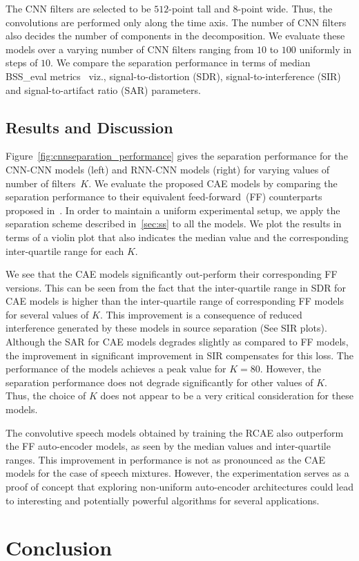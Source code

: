 \documentclass{article}
\begin{document}
The CNN filters are selected to be $512$-point tall and $8$-point wide. Thus, the convolutions are performed only along the time axis. The number of CNN filters also decides the number of components in the decomposition. We evaluate these models over a varying number of CNN filters ranging from $10$ to $100$ uniformly in steps of $10$. We compare the separation performance in terms of median BSS\_eval metrics~\cite{fevotte2005bss_eval} viz., signal-to-distortion (SDR), signal-to-interference (SIR) and signal-to-artifact ratio (SAR) parameters.

\subsection{Results and Discussion}
\label{subsec:results}
Figure~\ref{fig:cnnseparation_performance} gives the separation performance for the CNN-CNN models (left) and RNN-CNN models (right) for varying values of number of filters~$K$. We evaluate the proposed CAE models by comparing the separation performance to their equivalent feed-forward~(FF) counterparts proposed in~\cite{smaragdis2017aneural}. In order to maintain a uniform experimental setup, we apply the separation scheme described in~\ref{sec:ss} to all the models. We plot the results in terms of a violin plot that also indicates the median value and the corresponding inter-quartile range for each $K$.

We see that the CAE models significantly out-perform their corresponding FF versions. This can be seen from the fact that the inter-quartile range in SDR for CAE models is higher than the inter-quartile range of corresponding FF models for several values of $K$. This improvement is a consequence of reduced interference generated by these models in source separation (See SIR plots). Although the SAR for CAE models degrades slightly as compared to FF models, the improvement in significant improvement in SIR compensates for this loss. The performance of the models achieves a peak value for $K=80$. However, the separation performance does not degrade significantly for other values of $K$. Thus, the choice of $K$ does not appear to be a very critical consideration for these models.

The convolutive speech models obtained by training the RCAE also outperform the FF auto-encoder models, as seen by the median values and inter-quartile ranges. This improvement in performance is not as pronounced as the CAE models for the case of speech mixtures. However, the experimentation serves as a proof of concept that exploring non-uniform auto-encoder architectures could lead to interesting and potentially powerful algorithms for several applications.  

\section{Conclusion}
\label{sec:conclusion}




\end{document}
